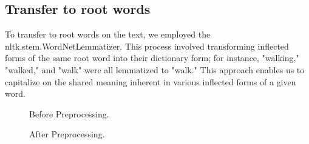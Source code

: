 \documentclass{article}
\begin{document}
\subsection{Transfer to root words}
To transfer to root words on the text, 
we employed the nltk.stem.WordNetLemmatizer. 
This process involved transforming inflected forms of the same root word into their dictionary form; for instance, "walking," "walked," and "walk" were all lemmatized to "walk." This approach enables us to capitalize on the shared meaning inherent in various inflected forms of a given word.
\begin{figure}
  \centering
  \caption{ Before Preprocessing.}
\end{figure}
\begin{figure}
  \centering
  \caption{ After Preprocessing.}
\end{figure}



\end{document}
